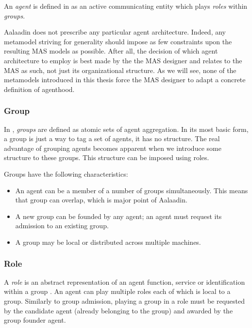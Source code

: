 An \textit{agent} is defined in \cite{Ferber97} as an active communicating entity which plays \textit{roles} within \textit{groups}.

Aalaadin does not prescribe any particular agent architecture.
Indeed, any metamodel striving for generality should impose as few constraints upon the resulting MAS models as possible.
After all, the decision of which agent architecture to employ is best made by the the MAS designer and relates to the MAS as such, not just its organizational structure.
As we will see, none of the metamodels introduced in this thesis force the MAS designer to adapt a concrete definition of agenthood.

\subsubsection*{Group}

In \cite{Ferber97}, \textit{groups} are defined as atomic sets of agent aggregation.
In its most basic form, a group is just a way to tag a set of agents, it has no structure.
The real advantage of grouping agents becomes apparent when we introduce some structure to these groups.
This structure can be imposed using roles.

Groups have the following characteristics:
\begin{itemize}
	\item An agent can be a member of a number of groups simultaneously.
	This means that group can overlap, which is major point of Aalaadin.
	\item A new group can be founded by any agent; an agent must request its admission to an existing group.
	\item A group may be local or distributed across multiple machines.
\end{itemize}

\subsubsection*{Role}

A \textit{role} is an abstract representation of an agent function, service or identification within a group \cite{Ferber97}.
An agent can play multiple roles each of which is local to a group.
Similarly to group admission, playing a group in a role must be requested by the candidate agent (already belonging to the group) and awarded by the group founder agent.

